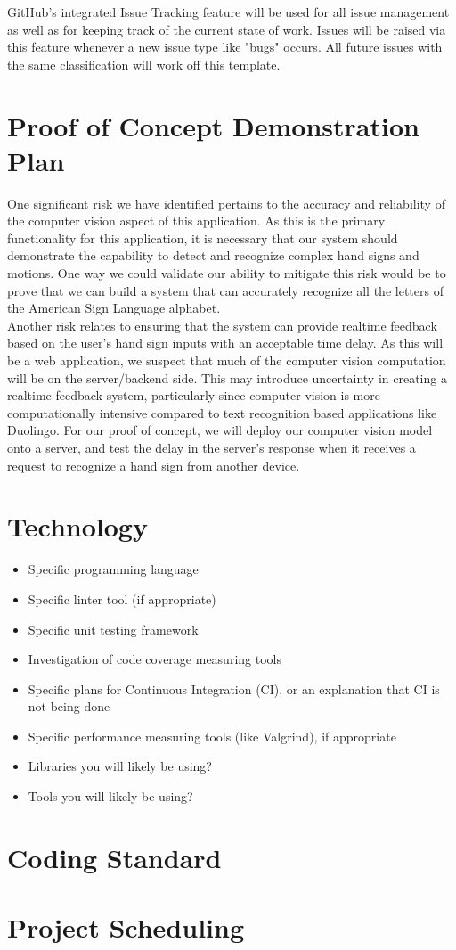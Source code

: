 \documentclass{article}
\begin{document}
GitHub's integrated Issue Tracking feature will be used for all issue management as well as for keeping track of the current state of work.  Issues will be raised via this feature whenever a new issue type like "bugs" occurs. All future issues with the same classification will work off this template.

\section{Proof of Concept Demonstration Plan}

One significant risk we have identified pertains to the accuracy and reliability of the computer vision aspect of this application. As this is the
primary functionality for this application, it is necessary that our system should demonstrate the capability to detect and recognize complex
hand signs and motions. One way we could validate our ability to mitigate this risk would be to prove that we can build a 
system that can accurately recognize all the letters of the American Sign Language alphabet.\\
Another risk relates to ensuring that the system can provide realtime feedback based on the user's hand sign inputs with
an acceptable time delay. As this will be a web application, we suspect that much of the computer vision computation will be on the 
server/backend side. This may introduce uncertainty in creating a realtime feedback system, particularly since computer vision is more computationally
intensive compared to text recognition based applications like Duolingo. For our proof of concept, we will deploy our computer vision model
onto a server, and test the delay in the server's response when it receives a request to recognize a hand sign from another device.

\section{Technology}

\begin{itemize}
\item Specific programming language
\item Specific linter tool (if appropriate)
\item Specific unit testing framework
\item Investigation of code coverage measuring tools
\item Specific plans for Continuous Integration (CI), or an explanation that CI
  is not being done
\item Specific performance measuring tools (like Valgrind), if
  appropriate
\item Libraries you will likely be using?
\item Tools you will likely be using?
\end{itemize}

\section{Coding Standard}

\section{Project Scheduling}

\end{document}
